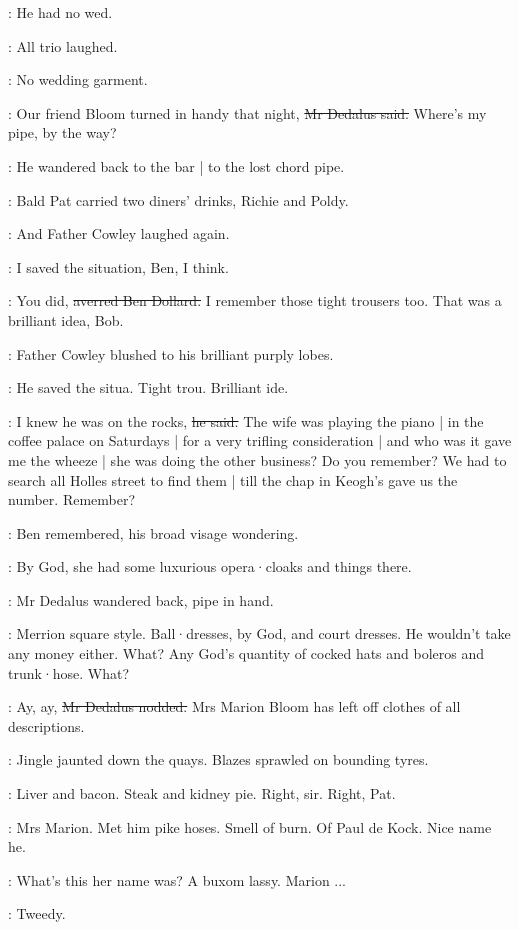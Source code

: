 \simon:
He had no wed.

:
All trio laughed.

\dollard:
No wedding garment.

\simon:
Our friend Bloom turned in handy that night,
\sout{Mr Dedalus said.}
Where's my pipe,
by the way?

:
He wandered back to the bar |
to the lost chord pipe.

:
Bald Pat carried
two diners' drinks,
Richie and Poldy.

:
And Father Cowley laughed again.

\cowley:
I saved the situation,
Ben,
I think.

\dollard:
You did,
\sout{averred Ben Dollard.}
I remember those tight trousers too.
That was a brilliant idea,
Bob.

:
Father Cowley blushed to his brilliant purply lobes.

:
He saved the situa.
Tight trou.
Brilliant ide.

\cowley:
I knew he was on the rocks,
\sout{he said.}
The wife was playing the piano |
in the coffee palace on Saturdays |
for a very trifling consideration |
and who was it gave me the wheeze |
she was doing the other business?
Do you remember?
We had to search all Holles street to find them |
till the chap in Keogh's gave us the number.
Remember?

:
Ben remembered,
his broad visage wondering.

\dollard:
By God,
she had some luxurious opera·cloaks
and things there.

:
Mr Dedalus wandered back,
pipe in hand.

\dollard:
Merrion square style.
Ball·dresses,
by God,
and court dresses.
He wouldn't take any money either.
What?
Any God's quantity of cocked hats
and boleros
and trunk·hose.
What?

\simon:
Ay, ay,
\sout{Mr Dedalus nodded.}
Mrs Marion Bloom has left off clothes
of all descriptions.

:
Jingle jaunted down the quays.
Blazes sprawled on bounding tyres.

:
Liver and bacon.
Steak and kidney pie.
Right, sir.
Right, Pat.

\BloomInt:
Mrs Marion.
Met him pike hoses.
Smell of burn.
Of Paul de Kock.
Nice name he.

\dollard:
What's this her name was?
A buxom lassy.
Marion ...

\simon:
Tweedy.

